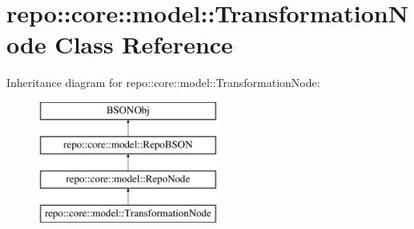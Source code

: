 \hypertarget{classrepo_1_1core_1_1model_1_1_transformation_node}{}\section{repo\+:\+:core\+:\+:model\+:\+:Transformation\+Node Class Reference}
\label{classrepo_1_1core_1_1model_1_1_transformation_node}
Inheritance diagram for repo\+:\+:core\+:\+:model\+:\+:Transformation\+Node\+:\begin{figure}[H]
\begin{center}
\leavevmode
\includegraphics[height=4.000000cm]{classrepo_1_1core_1_1model_1_1_transformation_node}
\end{center}
\end{figure}
